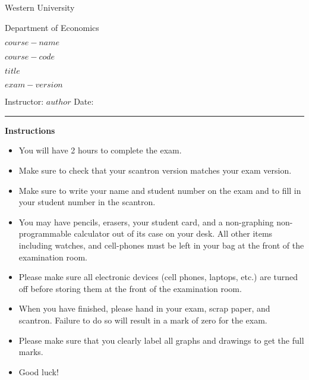 \begin{titlepage}
    \centering
    {\LARGE Western University\par}
    {\Large Department of Economics\par}
    \vspace{1cm}
    {\large $course-name$ \par
    $course-code$ \par
    $title$ \par
    $exam-version$ \par}
    \vspace{1.5cm}
    Instructor: $author$ \hfill Date:\enspace\rule{4cm}{0.4pt}\par
    \vspace{2cm}
    \raggedleft
    \vfill
    {\centering 
        {\bf Instructions \par}
    }
    \raggedleft
    \begin{itemize}
        \item You will have 2 hours to complete the exam.
        \item Make sure to check that your scantron version matches your exam version.
        \item Make sure to write your name and student number on the exam and to fill in your student number in the scantron.
        \item You may have pencils, erasers, your student card, and a non-graphing non-programmable calculator out of its case on your desk. All other items including watches, and cell-phones must be left in your bag at the front of the examination room.
        \item Please make sure all electronic devices (cell phones, laptops, etc.) are turned off before storing them at the front of the examination room.
        \item When you have finished, please hand in your exam, scrap paper, and scantron. Failure to do so will result in a mark of zero for the exam.
        \item Please make sure that you clearly label all graphs and drawings to get the full marks.
        \item Good luck!
    \end{itemize}
\end{titlepage}
\newpage

